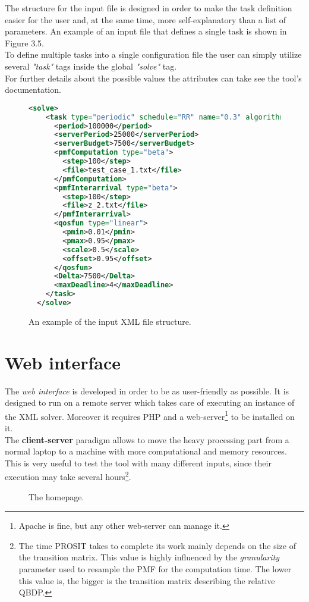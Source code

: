 The structure for the input file is designed in order to make the task definition easier for the user and, at the same time, more self-explanatory than a list of parameters. An example of an input file that defines a single task is shown in Figure 3.5.\\
To define multiple tasks into a single configuration file the user can simply utilize several \emph{"task"} tags inside the global \emph{"solve"} tag.\\ 
For further details about the possible values the attributes can take see the tool's documentation.  
\begin{figure}[H]
\begin{lstlisting}[frame=bt, language=XML, numbers=none]
  <solve>
    <task type="periodic" schedule="RR" name="0.3" algorithm="cyclic">
      <period>100000</period>
      <serverPeriod>25000</serverPeriod>
      <serverBudget>7500</serverBudget>
      <pmfComputation type="beta">
        <step>100</step>
        <file>test_case_1.txt</file>
      </pmfComputation>
      <pmfInterarrival type="beta">
        <step>100</step>
        <file>z_2.txt</file>
      </pmfInterarrival>
      <qosfun type="linear">
        <pmin>0.01</pmin>
        <pmax>0.95</pmax>
        <scale>0.5</scale>
        <offset>0.95</offset>
      </qosfun>
      <Delta>7500</Delta>
      <maxDeadline>4</maxDeadline>
    </task>
  </solve>
\end{lstlisting}
\caption{An example of the input XML file structure.}
\end{figure}

\section{Web interface}
The \emph{web interface} is developed in order to be as user-friendly as possible. It is designed to run on a remote server which takes care of executing an instance of the XML solver. Moreover it requires PHP and a web-server\footnote{Apache is fine, but any other web-server can manage it.} to be installed on it.\\
The \textbf{client-server} paradigm allows to move the heavy processing part from a normal laptop to a machine with more computational and memory resources. This is very useful to test the tool with many different inputs, since their execution may take several hours\footnote{The time PROSIT takes to complete its work mainly depends on the size of the transition matrix. This value is highly influenced by the \emph{granularity} parameter used to resample the PMF for the computation time. The lower this value is, the bigger is the transition matrix describing the relative QBDP.}.
\begin{figure}[H]
  \caption{The homepage.}
  \label{index}
\end{figure}

